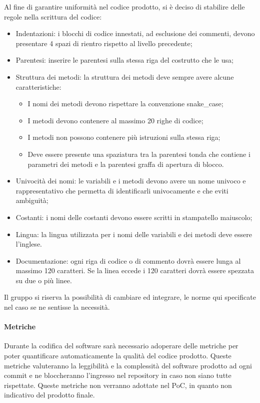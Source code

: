 Al fine di garantire uniformità nel codice prodotto, si è deciso di stabilire delle regole nella scrittura del codice:
\begin{itemize}
    \item Indentazioni: i blocchi di codice innestati, ad esclusione dei commenti, devono presentare 4 spazi di rientro
    rispetto al livello precedente;
    \item Parentesi: inserire le parentesi sulla stessa riga del costrutto che le usa;
    \item Struttura dei metodi: la struttura dei metodi deve sempre avere alcune caratteristiche:
    \begin{itemize}
        \item I nomi dei metodi devono rispettare la convenzione snake\_case;
        \item I metodi devono contenere al massimo 20 righe di codice;
        \item I metodi non possono contenere più istruzioni sulla stessa riga;
        \item Deve essere presente una spaziatura tra la parentesi tonda che contiene i parametri dei metodi e la
        parentesi graffa di apertura di blocco.
    \end{itemize}
    \item Univocità dei nomi: le variabili e i metodi devono avere un nome univoco e rappresentativo che permetta di
    identificarli univocamente e che eviti ambiguità;
    \item Costanti: i nomi delle costanti devono essere scritti in stampatello maiuscolo;
    \item Lingua: la lingua utilizzata per i nomi delle variabili e dei metodi deve essere l'inglese.
    \item Documentazione: ogni riga di codice o di commento dovrà essere lunga al massimo 120 caratteri. Se la linea
    eccede i 120 caratteri dovrà essere spezzata su due o più linee.
\end{itemize}
Il gruppo si riserva la possibilità di cambiare ed integrare, le norme qui specificate nel caso se ne sentisse la
necessità.

\paragraph{Metriche}

Durante la codifica del software sarà necessario adoperare delle metriche per poter quantificare automaticamente la
qualità del codice prodotto. Queste metriche valuteranno la leggibilità e la complessità del software prodotto ad ogni
commit e ne bloccheranno l'ingresso nel repository in caso non siano tutte rispettate.
Queste metriche non verranno adottate nel PoC, in quanto non indicativo del prodotto finale.

